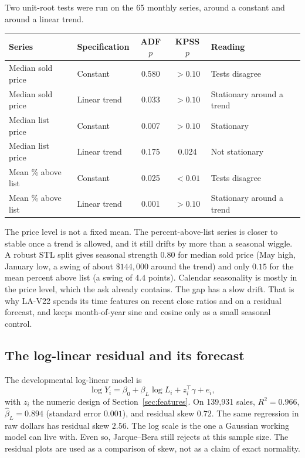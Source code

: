 \documentclass[11pt]{article}
\newcommand{\modelid}{LA-V22}
\begin{document}
Two unit-root tests were run on the 65 monthly series, around a constant and around a linear trend.

\begin{center}
\small
\begin{tabular}{llcc l}
\toprule
Series & Specification & ADF \(p\) & KPSS \(p\) & Reading \\
\midrule
Median sold price & Constant & 0.580 & \(>0.10\) & Tests disagree \\
Median sold price & Linear trend & 0.033 & \(>0.10\) & Stationary around a trend \\
Median list price & Constant & 0.007 & \(>0.10\) & Stationary \\
Median list price & Linear trend & 0.175 & 0.024 & Not stationary \\
Mean \% above list & Constant & 0.025 & \(<0.01\) & Tests disagree \\
Mean \% above list & Linear trend & 0.001 & \(>0.10\) & Stationary around a trend \\
\bottomrule
\end{tabular}
\end{center}

The price level is not a fixed mean. The percent-above-list series is closer to stable once a trend is allowed, and it still drifts by more than a seasonal wiggle. A robust STL split gives seasonal strength \(0.80\) for median sold price (May high, January low, a swing of about \(\$144{,}000\) around the trend) and only \(0.15\) for the mean percent above list (a swing of \(4.4\) points). Calendar seasonality is mostly in the price level, which the ask already contains. The gap has a slow drift. That is why \modelid{} spends its time features on recent close ratios and on a residual forecast, and keeps month-of-year sine and cosine only as a small seasonal control.

\subsection{The log-linear residual and its forecast}
\label{sec:ols}

The developmental log-linear model is
\[
\log Y_i = \beta_0 + \beta_L \log L_i + z_i^\top\gamma + e_i,
\]
with \(z_i\) the numeric design of Section~\ref{sec:features}. On 139{,}931 sales, \(R^2 = 0.966\), \(\hat\beta_L = 0.894\) (standard error \(0.001\)), and residual skew \(0.72\). The same regression in raw dollars has residual skew \(2.56\). The log scale is the one a Gaussian working model can live with. Even so, Jarque--Bera still rejects at this sample size. The residual plots are used as a comparison of skew, not as a claim of exact normality.
\end{document}
